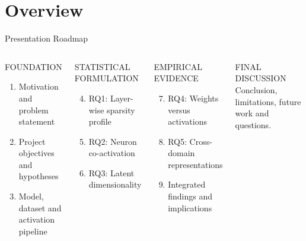 \documentclass[aspectratio=169,10pt]{beamer}
\begin{document}
\section{Overview}
\begin{frame}{Presentation Roadmap}
\begin{columns}[T,onlytextwidth]
\begin{block}{FOUNDATION}
\begin{enumerate}
  \item Motivation and problem statement
  \item Project objectives and hypotheses
  \item Model, dataset and activation pipeline
\end{enumerate}
\end{block}
\begin{block}{STATISTICAL FORMULATION}
\begin{enumerate}\setcounter{enumi}{3}
  \item RQ1: Layer-wise sparsity profile
  \item RQ2: Neuron co-activation
  \item RQ3: Latent dimensionality
\end{enumerate}
\end{block}
\begin{block}{EMPIRICAL EVIDENCE}
\begin{enumerate}\setcounter{enumi}{6}
  \item RQ4: Weights versus activations
  \item RQ5: Cross-domain representations
  \item Integrated findings and implications
\end{enumerate}
\end{block}
\begin{alertblock}{FINAL DISCUSSION}
Conclusion, limitations, future work and questions.
\end{alertblock}
\end{columns}
\end{frame}
\end{document}

